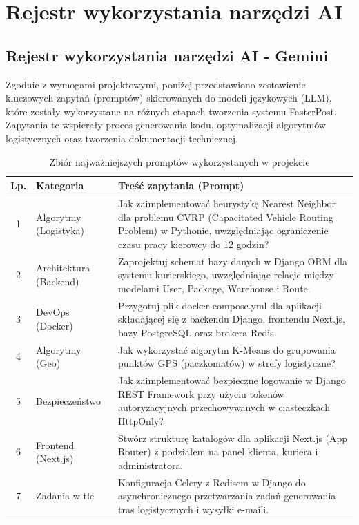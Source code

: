 \chapter{Rejestr wykorzystania narzędzi AI}
\raggedbottom
\section{Rejestr wykorzystania narzędzi AI - Gemini}
Zgodnie z wymogami projektowymi, poniżej przedstawiono zestawienie kluczowych zapytań (promptów) skierowanych do modeli językowych (LLM), które zostały wykorzystane na różnych etapach tworzenia systemu FasterPost. Zapytania te wspierały proces generowania kodu, optymalizacji algorytmów logistycznych oraz tworzenia dokumentacji technicznej.

\begin{table}[H]
    \centering
    \caption{Zbiór najważniejszych promptów wykorzystanych w projekcie}
    \label{tab:prompts}
    \small
    \renewcommand{\arraystretch}{1.4}
    \begin{tabular}{|c|p{3cm}|p{9cm}|}
        \hline
        \textbf{Lp.} & \textbf{Kategoria} & \textbf{Treść zapytania (Prompt)} \\ \hline
        1 & Algorytmy (Logistyka) & Jak zaimplementować heurystykę Nearest Neighbor dla problemu CVRP (Capacitated Vehicle Routing Problem) w Pythonie, uwzględniając ograniczenie czasu pracy kierowcy do 12 godzin? \\ \hline
        2 & Architektura (Backend) & Zaprojektuj schemat bazy danych w Django ORM dla systemu kurierskiego, uwzględniając relacje między modelami User, Package, Warehouse i Route. \\ \hline
        3 & DevOps (Docker) & Przygotuj plik docker-compose.yml dla aplikacji składającej się z backendu Django, frontendu Next.js, bazy PostgreSQL oraz brokera Redis. \\ \hline
        4 & Algorytmy (Geo) & Jak wykorzystać algorytm K-Means do grupowania punktów GPS (paczkomatów) w strefy logistyczne? \\ \hline
        5 & Bezpieczeństwo & Jak zaimplementować bezpieczne logowanie w Django REST Framework przy użyciu tokenów autoryzacyjnych przechowywanych w ciasteczkach HttpOnly? \\ \hline
        6 & Frontend (Next.js) & Stwórz strukturę katalogów dla aplikacji Next.js (App Router) z podziałem na panel klienta, kuriera i administratora. \\ \hline
        7 & Zadania w tle & Konfiguracja Celery z Redisem w Django do asynchronicznego przetwarzania zadań generowania tras logistycznych i wysyłki e-maili. \\ \hline

\end{tabular}
\end{table}
